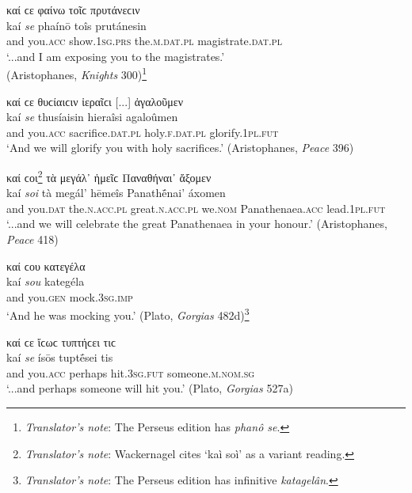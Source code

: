 \largerpage[2]
\begin{exe}
\ex καί ϲε φαίνω τοῖϲ πρυτάνεϲιν\\
\gll kaí \emph{se} phaínō toîs prutánesin\\
and you.\textsc{acc} show.\textsc{1sg.prs} the.\textsc{m.dat.pl}
magistrate.\textsc{dat.pl}\\
\trans `...and I am exposing you to the magistrates.'\\
(Aristophanes, \textit{Knights} 300)\footnote{\emph{Translator's note}: The Perseus edition has \textit{phanô se}.}
\label{kaise9}
\end{exe}
\clearpage

\begin{exe}
\ex καί ϲε θυϲίαιϲιν ἱεραῖϲι {[}...{]} ἀγαλοῦμεν\\
\gll kaí \emph{se} thusíaisin hieraîsi agaloûmen\\
and you.\textsc{acc} sacrifice.\textsc{dat.pl} holy.\textsc{f.dat.pl} glorify.\textsc{1pl.fut}\\
\trans `And we will glorify you with holy sacrifices.' (Aristophanes, \textit{Peace} 396)
\label{kaise10}
\end{exe}

\begin{exe}
\ex καί ϲοι\footnote{\emph{Translator's note}: Wackernagel cites `kaì soì' as a variant
reading.} τὰ μεγάλ᾽ ἡμεῖϲ Παναθήναι᾽ ἄξομεν\\
\gll kaí \emph{soi} tà megál' hēmeîs Panathḗnai' áxomen\\
and you.\textsc{dat} the.\textsc{n.acc.pl} great.\textsc{n.acc.pl} we.\textsc{nom} Panathenaea.\textsc{acc} lead.\textsc{1pl.fut}\\
\trans `...and we will celebrate the great Panathenaea in your honour.' (Aristophanes, \textit{Peace} 418)
\label{kaisoi2}
\end{exe}

\begin{exe}
\ex καί ϲου κατεγέλα\\
\gll kaí \emph{sou} kategéla\\
and you.\textsc{gen} mock.\textsc{3sg.imp}\\
\trans `And he was mocking you.' (Plato, \textit{Gorgias} 482d)\footnote{\emph{Translator's note}: The Perseus edition has infinitive \textit{katagelân}.}
\label{kaisou1}
\end{exe}

\begin{exe}
\ex καί ϲε ἴϲωϲ τυπτήϲει τιϲ\\
\gll kaí \emph{se} ísōs tuptḗsei tis\\
and you.\textsc{acc} perhaps hit.\textsc{3sg.fut} someone.\textsc{m.nom.sg}\\
\trans `...and perhaps someone will hit you.' (Plato, \textit{Gorgias} 527a)
\label{kaise11}
\end{exe}

